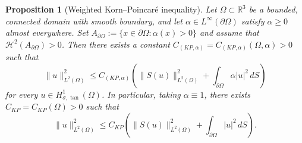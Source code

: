 \documentclass[11pt,reqno]{amsart}
\theoremstyle{plain}
\newtheorem{proposition}[thm]{Proposition}
\numberwithin{equation}{section}
\begin{document}
\begin{proposition}[Weighted Korn--Poincar\'e inequality]\label{thm:coupled_korn}
Let $\Omega\subset\mathbb{R}^3$ be a bounded, connected domain with smooth boundary, and let $\alpha\in L^\infty(\partial\Omega)$ satisfy $\alpha\ge0$ almost everywhere. Set $A_{\partial\Omega}:=\{x\in\partial\Omega:\alpha(x)>0\}$ and assume that $\mathcal H^2(A_{\partial\Omega})>0$. Then there exists a constant $C_{(KP,\alpha)}=C_{(KP,\alpha)}(\Omega,\alpha)>0$ such that 
\begin{equation}\label{kornpoincare2}
\|u\|^2_{L^2(\Omega)}\le C_{(KP,\alpha)}\left(\|S(u)\|_{L^2(\Omega)}^2+\int_{\partial\Omega}\alpha|u|^2\,dS\right)
\end{equation}
for every $u\in H^1_{\sigma,\tan}(\Omega)$.
In particular, taking $\alpha\equiv 1$, there exists $C_{KP}=C_{KP}(\Omega)>0$ such that
\begin{equation}\label{kornpoincare1}
\|u\|^2_{L^2(\Omega)}\le C_{KP}\left(\|S(u)\|_{L^2(\Omega)}^2+\int_{\partial\Omega}|u|^2\,dS\right).
\end{equation}
\end{proposition}
\end{document}
